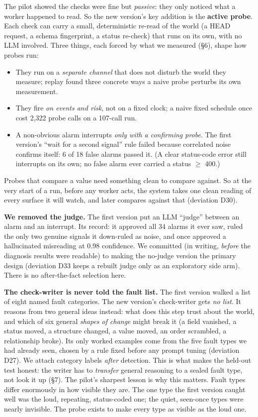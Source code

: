 \documentclass[acmsmall,screen]{acmart}
\begin{document}
The pilot showed the checks were fine but \emph{passive}: they only noticed
what a worker happened to read. So the new version's key addition is the
\textbf{active probe}. Each check can carry a small, deterministic re-read of
the world (a HEAD request, a schema fingerprint, a status re-check) that runs on
its own, with no LLM involved. Three things, each forced by what we measured
(\S6), shape how probes run:

\begin{itemize}
  \item They run on a \emph{separate channel} that does not disturb the world
  they measure; replay found three concrete ways a naive probe perturbs its
  own measurement.
  \item They fire \emph{on events and risk}, not on a fixed clock; a naive
  fixed schedule once cost 2,322 probe calls on a 107-call run.
  \item A non-obvious alarm interrupts \emph{only with a confirming probe}. The
  first version's ``wait for a second signal'' rule failed because correlated
  noise confirms itself: 6 of 18 false alarms passed it. (A clear status-code
  error still interrupts on its own; no false alarm ever carried a status
  $\ge$ 400.)
\end{itemize}

Probes that compare a value need something clean to compare against. So at the
very start of a run, before any worker acts, the system takes one clean reading
of every surface it will watch, and later compares against that (deviation D30).

\textbf{We removed the judge.} The first version put an LLM ``judge'' between an
alarm and an interrupt. Its record: it approved all 34 alarms it ever saw,
ruled the only two genuine signals it down-ruled as noise, and once approved a
hallucinated misreading at 0.98 confidence. We committed (in writing,
\emph{before} the diagnosis results were readable) to making the no-judge
version the primary design (deviation D33 keeps a rebuilt judge only as an
exploratory side arm). There is no after-the-fact selection here.

\textbf{The check-writer is never told the fault list.} The first version
walked a list of eight named fault categories. The new version's check-writer
gets \emph{no list}. It reasons from two general ideas instead: what does this
step trust about the world, and which of six general \emph{shapes of change}
might break it (a field vanished, a status moved, a structure changed, a value
moved, an order scrambled, a relationship broke). Its only worked examples come
from the five fault types we had already seen, chosen by a rule fixed before any
prompt tuning (deviation D27). We attach category labels \emph{after} detection.
This is what makes the held-out test honest: the writer has to \emph{transfer}
general reasoning to a sealed fault type, not look it up (\S7). The pilot's
sharpest lesson is why this matters. Fault types differ enormously in how
visible they are. The one type the first version caught well was the loud,
repeating, status-coded one; the quiet, seen-once types were nearly invisible.
The probe exists to make every type as visible as the loud one.
\end{document}
